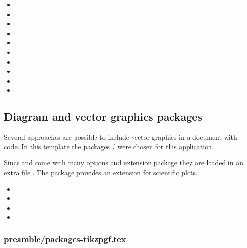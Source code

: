 \begin{itemize}[noitemsep]
\item {}
\item {}
\item {}
\item {}
\item {}
\item {}
\item {}
\item {}
\item {}
\item {}
\end{itemize}



\subsection{Diagram and vector graphics packages}
\label{sec:packages:pgf}

Several approaches are possible to include vector graphics in a \latex document with \latex-code. In this template the packages / were chosen for this application.

Since  and  come with many options and 
extension package they are loaded in an extra file 
. The package  
provides an extension for scientific plots.

\begin{itemize}[noitemsep]
\item {}
\item {}
\item {}
\item {}
\end{itemize}


\subsubsection{preamble/packages-tikzpgf.tex}

